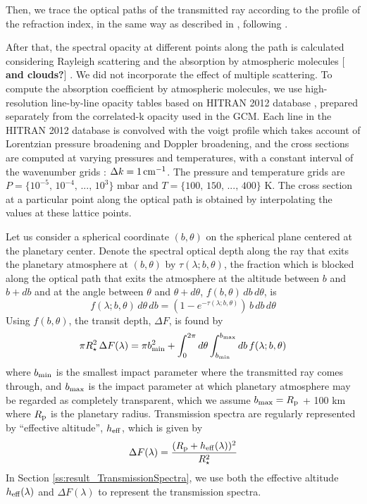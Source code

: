 \documentclass[11pt,numberedappendix,twocolappendix,]{emulateapj}
\def\memo#1{\color{red}$[${\bf #1}$]$ \color{black}}
\begin{document}
Then, we trace the optical paths of the transmitted ray according to the profile of the refraction index, in the same way as described in \citet{vanderWerf2008}, following \citet{Misra2014}. 

After that, the spectral opacity at different points along the path is calculated considering Rayleigh scattering and the absorption by atmospheric molecules \memo{and clouds?}. 
We did not incorporate the effect of multiple scattering. 
To compute the absorption coefficient by atmospheric molecules, we use high-resolution line-by-line opacity tables based on HITRAN 2012 database \citep{Rothman2013}, prepared separately from the correlated-k opacity used in the GCM. 
Each line in the HITRAN 2012 database is convolved with the voigt profile which takes account of Lorentzian pressure broadening and Doppler broadening, 
and the cross sections are computed at varying pressures and temperatures, with a constant interval of the wavenumber grids : $\Delta k = 1\,{\rm cm}^{-1}$. 
The pressure and temperature grids are $P = \{10^{-5},\, 10^{-4},\,...,\,10^3\}$ mbar and $T = \{100,\, 150,\,...,\, 400\}$ K. 
The cross section at a particular point along the optical path is obtained by interpolating the values at these lattice points. 

Let us consider a spherical coordinate $(b, \theta )$ on the spherical plane centered at the planetary center. 
Denote the spectral optical depth along the ray that exits the planetary atmosphere at $(b, \theta )$ by $\tau (\lambda; b, \theta )$, 
the fraction which is blocked along the optical path that exits the atmosphere at the altitude between $b$ and $b+db$ and at the angle between $\theta $ and $\theta + d\theta $, $f(b, \theta ) \, db \, d\theta$, is 
\begin{equation}
f(\lambda; b, \theta ) \, d\theta \, db = ( 1 - e^{-\tau (\lambda; b, \theta )} ) \, b \, db \, d\theta 
\end{equation}
Using $f(b, \theta )$, the transit depth, $\Delta F$, is found by
\begin{equation}
\pi R_{\star } ^2 \, \Delta F (\lambda) = \pi b_{\rm min}^2 + \int_0^{2\pi} d\theta \int_{b_{\rm min}}^{b_{\rm max}} db \, f(\lambda; b, \theta )
\end{equation}
where $b_{\rm min}$ is the smallest impact parameter where the transmitted ray comes through, and $b_{\rm max}$ is the impact parameter at which planetary atmosphere may be regarded as completely transparent, which we assume $b_{\rm max} = R_{\rm p}$ + 100 km where $R_{\rm p}$ is the planetary radius. 
Transmission spectra are regularly represented by ``effective altitude'', $h_{\rm eff}$, which is given by
\begin{equation}
\Delta F(\lambda) = \frac{( R_{\rm p} + h_{\rm eff}(\lambda)  )^2}{R_{\star }^2}
\end{equation}
In Section \ref{ss:result_TransmissionSpectra}, we use both the effective altitude $h_{\rm eff}  (\lambda)$ and $\Delta F (\lambda)$ to represent the transmission spectra. 
\end{document}
